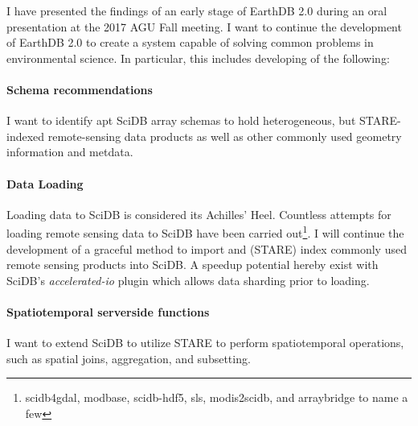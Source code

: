 \documentclass[letterpaper, parskip=half]{scrartcl}
\begin{document}
I have presented the findings of an early stage of EarthDB 2.0 during an oral presentation at the 2017 \gls{AGU} Fall meeting. I want to continue the development of EarthDB 2.0 to create a system capable of solving common problems in environmental science. In particular, this includes developing of the following:

\paragraph{Schema recommendations}
I want to identify apt SciDB array schemas to hold heterogeneous, but STARE-indexed remote-sensing data products as well as other commonly used geometry information and metdata.


\paragraph{Data Loading}
Loading data to SciDB is considered its Achilles' Heel. Countless attempts for loading remote sensing data to SciDB have been carried out\footnote{scidb4gdal, modbase, scidb-hdf5, sls, modis2scidb, and arraybridge to name a few}. 
I will continue the development of a graceful method to import and (STARE) index commonly used remote sensing products into SciDB. A speedup potential hereby exist with SciDB's \textit{accelerated-io} plugin which allows data sharding prior to loading. 



\paragraph{Spatiotemporal serverside functions}
I want to extend SciDB to utilize STARE to perform spatiotemporal operations, such as spatial joins, aggregation, and subsetting.
\end{document}
